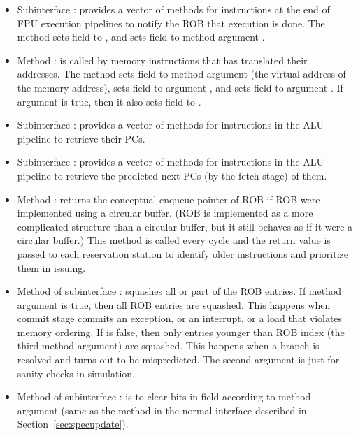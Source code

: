\begin{itemize}
    \item Subinterface : provides a vector of methods for instructions at the end of FPU execution pipelines to notify the ROB that execution is done.
    The method sets field  to , and sets field  to method argument .
    
    \item Method : is called by memory instructions that has translated their addresses.
    The method sets field  to method argument  (the virtual address of the memory address), sets field  to argument , and sets field  to argument .
    If argument  is true, then it also sets field  to .
    
    \item Subinterface : provides a vector of methods for instructions in the ALU pipeline to retrieve their PCs.
    
    \item Subinterface : provides a vector of methods for instructions in the ALU pipeline to retrieve the predicted next PCs (by the fetch stage) of them.
    
    \item Method : returns the conceptual enqueue pointer of ROB if ROB were implemented using a circular buffer.
    (ROB is implemented as a more complicated structure than a circular buffer, but it still behaves as if it were a circular buffer.)
    This method is called every cycle and the return value is passed to each reservation station to identify older instructions and prioritize them in issuing.
    
    \item Method  of subinterface : squashes all or part of the ROB entries.
    If method argument  is true, then all ROB entries are squashed.
    This happens when commit stage commits an exception, or an interrupt, or a load that violates memory ordering.
    If  is false, then only entries younger than ROB index  (the third method argument) are squashed.
    This happens when a branch is resolved and turns out to be mispredicted.
    The second argument  is just for sanity checks in simulation.
    
    \item Method  of subinterface : is to clear bits in field  according to method argument  (same as the method in the normal  interface described in Section~\ref{sec:specupdate}).
\end{itemize}

